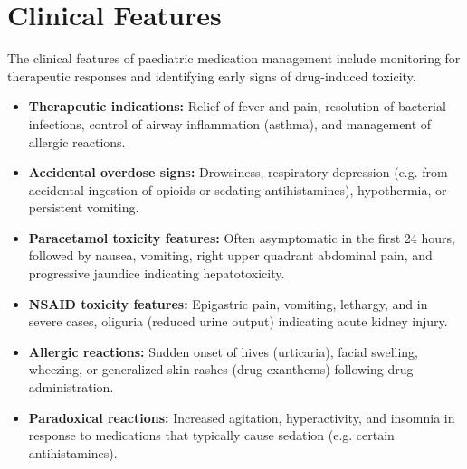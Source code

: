 \section*{Clinical Features}
The clinical features of paediatric medication management include monitoring for therapeutic responses and identifying early signs of drug-induced toxicity.
\begin{itemize}
    \item \textbf{Therapeutic indications:} Relief of fever and pain, resolution of bacterial infections, control of airway inflammation (asthma), and management of allergic reactions.
    \item \textbf{Accidental overdose signs:} Drowsiness, respiratory depression (e.g. from accidental ingestion of opioids or sedating antihistamines), hypothermia, or persistent vomiting.
    \item \textbf{Paracetamol toxicity features:} Often asymptomatic in the first 24 hours, followed by nausea, vomiting, right upper quadrant abdominal pain, and progressive jaundice indicating hepatotoxicity.
    \item \textbf{NSAID toxicity features:} Epigastric pain, vomiting, lethargy, and in severe cases, oliguria (reduced urine output) indicating acute kidney injury.
    \item \textbf{Allergic reactions:} Sudden onset of hives (urticaria), facial swelling, wheezing, or generalized skin rashes (drug exanthems) following drug administration.
    \item \textbf{Paradoxical reactions:} Increased agitation, hyperactivity, and insomnia in response to medications that typically cause sedation (e.g. certain antihistamines).
\end{itemize}

